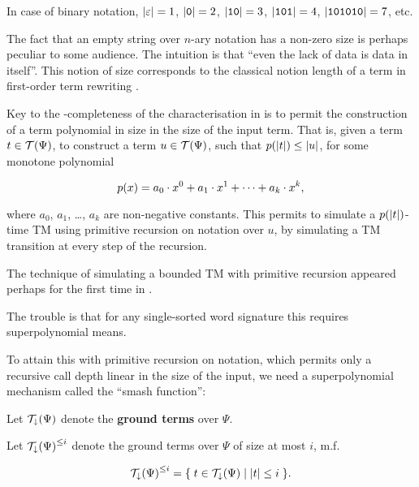 \begin{example} In case of binary notation, ${\mathopen{}\left|{\varepsilon}\right|\mathclose{}}=1$,
${\mathopen{}\left|{\mathtt{0}}\right|\mathclose{}} = 2$, ${\mathopen{}\left|{\mathtt{1}\mathtt{0}}\right|\mathclose{}} = 3$,
${\mathopen{}\left|{\mathtt{1}\mathtt{0}\mathtt{1}}\right|\mathclose{}} = 4$,
${\mathopen{}\left|{\mathtt{1}\mathtt{0}\mathtt{1}\mathtt{0}\mathtt{1}\mathtt{0}}\right|\mathclose{}} = 7$, etc.
\end{example}

\begin{remark} The fact that an empty string over $n$-ary notation has a
non-zero size is perhaps peculiar to some audience. The intuition is that
``even the lack of data is data in itself''. This notion of size corresponds to
the classical notion length of a term in first-order term rewriting
\cite{klop-vrijer-2003}. \end{remark}

Key to the \FPTIME{}-completeness of the characterisation in \cite{cobham-1965}
is to permit the construction of a term polynomial in size in the size of the
input term.  That is, given a term $t \in \mathcal{T}{\mathopen{}\left({\Psi}\right)\mathclose{}}$, to construct a
term $u \in \mathcal{T}{\mathopen{}\left({\Psi}\right)\mathclose{}}$, such that $p{\mathopen{}\left({{\mathopen{}\left|{t}\right|\mathclose{}}}\right)\mathclose{}} \leq {\ensuremath{\mathopen{}\left|{u}\right|\mathclose{}}}$, for
some monotone polynomial

$$p{\mathopen{}\left({x}\right)\mathclose{}}=a_0 \cdot x^0 + a_1 \cdot x^1 + \cdots + a_k \cdot x^k,$$

where $a_0$, $a_1$, \ldots, $a_k$ are non-negative constants. This permits to
simulate a $p{\mathopen{}\left({{\mathopen{}\left|{t}\right|\mathclose{}}}\right)\mathclose{}}$-time TM using primitive recursion on notation over
$u$, by simulating a TM transition at every step of the recursion.

\begin{remark} The technique of simulating a bounded TM with primitive
recursion appeared perhaps for the first time in \cite[.1/176]{minsky-1967}.  \end{remark}

The trouble is that for any single-sorted word signature this requires
superpolynomial means.


 
To attain this with primitive recursion on notation, which
permits only a recursive call depth linear in the size of the input, we need a
superpolynomial mechanism called the ``smash function'': 


\begin{definition} Let $\mathcal{T}_\downarrow{\ensuremath{\mathopen{}\left({\Psi}\right)\mathclose{}}}$ denote the
\textbf{ground terms} over $\Psi$. \end{definition}

\begin{definition} Let $\mathcal{T}_\downarrow{\ensuremath{\mathopen{}\left({\Psi}\right)\mathclose{}}}^{\leq i}$ denote the
ground terms over $\Psi$ of size at most $i$, m.f.

$$\mathcal{T}_\downarrow{\ensuremath{\mathopen{}\left({\Psi}\right)\mathclose{}}}^{\leq i} = \mathopen{}\left\{\mathrel{}{ t \in
\mathcal{T}_\downarrow{\ensuremath{\mathopen{}\left({\Psi}\right)\mathclose{}}} \mathrel{}\mid\mathrel{}{ {\mathopen{}\left|{t}\right|\mathclose{}} \leq i }}\mathrel{}\right\}\mathclose{}.$$

\end{definition}

